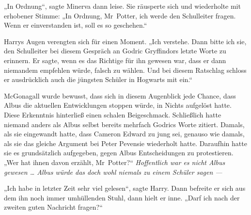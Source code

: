 „In Ordnung“, sagte Minerva dann leise. Sie räusperte sich und wiederholte mit erhobener Stimme:
„In Ordnung, Mr~Potter, ich werde den Schulleiter fragen. Wenn er einverstanden ist, soll es so geschehen.“

Harrys Augen verengten sich für einen Moment.
„Ich verstehe. Dann bitte ich sie, den Schulleiter bei diesem Gespräch an Godric Gryffindors letzte Worte zu erinnern. Er sagte, wenn es das Richtige für ihn gewesen war, dass er dann niemandem empfehlen würde, falsch zu wählen. Und bei diesem Ratschlag schloss er ausdrücklich auch die jüngsten Schüler in Hogwarts mit ein.“

McGonagall wurde bewusst, dass sich in diesem Augenblick jede Chance, dass Albus die aktuellen Entwicklungen stoppen würde, in Nichts aufgelöst hatte. Diese Erkenntnis hinterließ einen schalen Beigeschmack. Schließlich hatte niemand anders als Albus selbst bereits mehrfach Godrics Worte zitiert. Damals, als sie eingewandt hatte, dass Cameron Edward zu jung sei, genauso wie damals, als sie das gleiche Argument bei Peter Pevensie wiederholt hatte. Daraufhin hatte sie es grundsätzlich aufgegeben, gegen Albus Entscheidungen zu protestieren.
„Wer hat ihnen davon erzählt, Mr~Potter?“ \emph{Hoffentlich war es nicht Albus gewesen … Albus würde das doch wohl niemals zu einem Schüler \emph{sagen} —}

„Ich habe in letzter Zeit sehr viel gelesen“, sagte Harry. Dann befreite er sich aus dem ihn noch immer umhüllenden Stuhl, dann hielt er inne.
„Darf ich nach der zweiten guten Nachricht fragen?“

